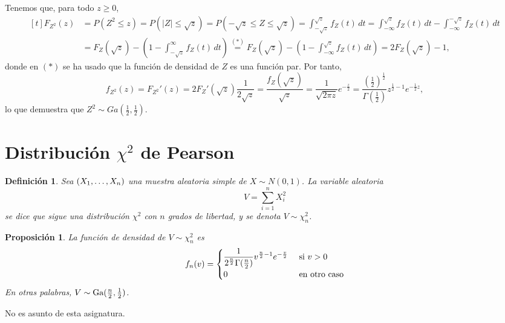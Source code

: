 \documentclass[11pt]{report}
\makeatletter
\renewenvironment{proof}[1][\proofname]{\par
  \pushQED{\qed}%
  \normalfont \topsep\z@skip %
  \trivlist
  \item[\hskip\labelsep
        \itshape
    #1\@addpunct{.}]\ignorespaces
}{%
  \popQED\endtrivlist\@endpefalse
}
\newtheorem{proposition}{Proposición}
\newtheorem{definition}{Definición}
\theoremstyle{definition}
\makeatother
\begin{document}
\begin{proof}
Tenemos que, para todo $z \geq 0$,
\[\begin{aligned}[t]
F_{Z^2}(z) &= P(Z^2 \leq z) = P(|Z| \leq \sqrt{z}) = P(-\sqrt{z} \leq Z \leq \sqrt{z}) = \int_{-\sqrt{z}}^{\sqrt{z}} f_Z(t) \, dt = \int_{-\infty}^{\sqrt{z}}f_Z(t) \, dt - \int_{-\infty}^{-\sqrt{z}} f_Z(t) \, dt \\
&= F_Z(\sqrt{z})-(1-\int_{-\sqrt{z}}^\infty f_Z(t) \, dt) \overset{(\ast)}{=} F_Z(\sqrt{z})-(1-\int_{-\infty}^{\sqrt{z}} f_Z(t) \, dt) = 2F_Z(\sqrt{z})-1,
\end{aligned}
\]
donde en $(\ast)$ se ha usado que la función de densidad de $Z$ es una función par. Por tanto,
\[f_{Z^2}(z) = F_{Z^2}'(z) = 2F_Z'(\sqrt{z}) \frac{1}{2\sqrt{z}} = \frac{f_Z(\sqrt{z})}{\sqrt{z}} =\frac{1}{\sqrt{2\pi z}}e^{-\frac{z}{2}} = \frac{(\frac{1}{2})^{\frac{1}{2}}}{\Gamma(\frac{1}{2})}z^{\frac{1}{2}-1}e^{-\frac{1}{2}z},\]
lo que demuestra que $Z^2\sim Ga(\frac{1}{2},\frac{1}{2})$.
\end{proof}

\section{Distribución \texorpdfstring{$\chi^2$}{TEXT} de Pearson}

\begin{definition}
Sea $(X_1,\mathellipsis,X_n)$ una muestra aleatoria simple de $X \sim N(0,1)$. La variable aleatoria
\[V = \sum_{i=1}^n X_i^2\]
se dice que sigue una \emph{distribución $\chi^2$ con $n$ grados de libertad}, y se denota $V \sim \chi_n^2$.
\end{definition}

\begin{proposition}
    La función de densidad de $V \sim \chi^2_n$ es
    \[f_n(v) = \begin{cases}
        \displaystyle \frac{1}{2^{\frac{n}{2}}\Gamma(\frac{n}{2})}v^{\frac{n}{2}-1}e^{-\frac{v}{2}} & $ si $ v >0 \\
        0 & $ en otro caso$
    \end{cases}\]
En otras palabras, $V \sim \textup{Ga}(\frac{n}{2},\frac{1}{2})$.

\end{proposition}

\begin{proof}
    No es asunto de esta asignatura.
\end{proof}
\end{document}
